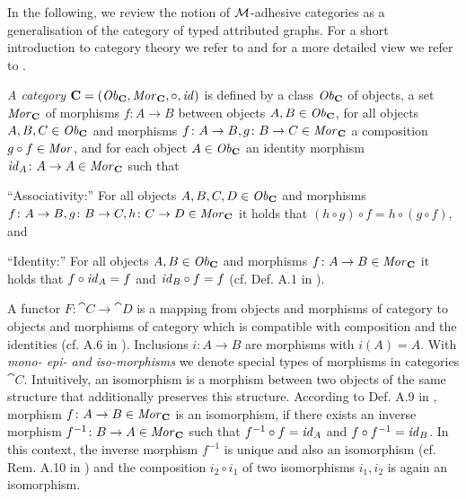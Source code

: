 In the following, we review the notion of ${\cal M}$-adhesive categories as a generalisation of the category of typed attributed graphs.
For a short introduction to category theory we refer to \cite{Ehrig:2006:FAG:1121741} and for a more detailed view we refer to \cite{Ehrig:1990:FAS:77299,Adamek:1990:ACC:78162}.

\begin{remark}
\label{rem:sec-gt-M-adh}
\emph{A category $\mathbf{C}=(\mathit{Ob}_\mathbf{C},\mathit{Mor}_\mathbf{C},\circ,\mathit{id})$} is defined by a class $\mathit{Ob}_\mathbf{C}$ of objects, a set $\mathit{Mor}_\mathbf{C}$ of morphisms $f\colon A \to B$ between objects $A,B \in \mathit{Ob}_\mathbf{C}$, for all objects $A,B,C \in \mathit{Ob}_\mathbf{C}$ and morphisms $f\colon A \to B,g\colon B \to C \in \mathit{Mor}_\mathbf{C}$ a composition $g \circ f \in \mathit{Mor}$, and for each object $A \in \mathit{Ob}_\mathbf{C}$ an identity morphism $\mathit{id}_A\colon A \to A \in \mathit{Mor}_\mathbf{C}$ such that
\begin{enumerate*}
\item [``Associativity:''] For all objects $A,B,C,D \in \mathit{Ob}_\mathbf{C}$ and morphisms $f\colon A \to B,g\colon B \to C,h\colon C \to D \in \mathit{Mor}_\mathbf{C}$ it holds that $(h \circ g) \circ f=h \circ (g \circ f)$, and
\item [``Identity:''] For all objects $A,B \in \mathit{Ob}_\mathbf{C}$ and morphisms $f\colon A \to B \in \mathit{Mor}_\mathbf{C}$ it holds that $f \circ \mathit{id}_A=f$ and $\mathit{id}_B \circ f=f$ (cf. Def. A.1 in \cite{Ehrig:2006:FAG:1121741}).
\end{enumerate*}
A functor  $F\colon \cat{C} \to \cat{D}$ is a mapping from objects and morphisms of category  to objects and morphisms of category  which is compatible with composition and the identities (cf. A.6 in \cite{Ehrig:2006:FAG:1121741}).
Inclusions $i\colon A \to B$ are morphisms with $i(A)=A$.
With \emph{mono- epi- and iso-morphisms} we denote special types of morphisms in categories $\cat{C}$.
Intuitively, an isomorphism is a morphism between two objects of the same structure that additionally preserves this structure.
According to Def. A.9 in \cite{Ehrig:2006:FAG:1121741}, morphism $f\colon A \to B \in \mathit{Mor}_\mathbf{C}$ is an isomorphism, if there exists an inverse morphism $f^{-1}\colon B \to A \in \mathit{Mor}_\mathbf{C}$ such that $f^{-1} \circ f=\mathit{id}_A$ and $f \circ f^{-1}=\mathit{id}_B$.
In this context, the inverse morphism $f^{-1}$ is unique and also an isomorphism (cf. Rem. A.10 in \cite{Ehrig:2006:FAG:1121741}) and the composition $i_2 \circ i_1$ of two isomorphisms $i_1,i_2$ is again an isomorphism.

\end{remark}
